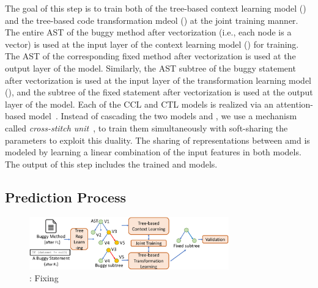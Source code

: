 The goal of this step is to train both of the tree-based context
learning model () and the tree-based code transformation
mdeol () at the joint training manner. The entire AST of the
buggy method after vectorization (i.e., each node is a vector) is used
at the input layer of the context learning model () for
training. The AST of the corresponding fixed method after
vectorization is used at the output layer of the 
model. Similarly, the AST subtree of the buggy statement after
vectorization is used at the input layer of the transformation
learning model (), and the subtree of the fixed statement
after vectorization is used at the output layer of the 
model. Each of the CCL and CTL models is realized via an
attention-based  model~\cite{yi}. Instead of cascading
the two models  and , we use a mechanism called
{\em cross-stitch unit}~\cite{misra2016cross}, to train them
simultaneously with soft-sharing the parameters to exploit this
duality. The sharing of representations between  amd
 is modeled by learning a linear combination of the input
features in both models. The output of this step includes the trained
 and  models.

\subsection{Prediction Process}

\begin{figure}[t]
	\centering
	\includegraphics[width=3.4in]{graphs/overview-predict.png}
	\caption{{\tool}: Fixing}
	\label{overview-fixing}
\end{figure}

